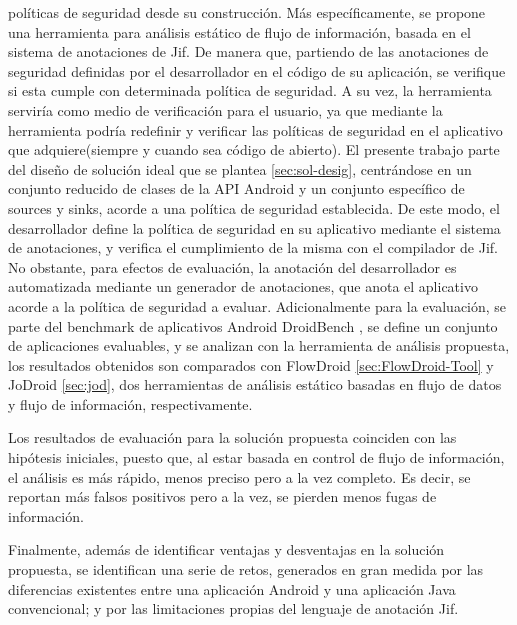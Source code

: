 políticas de seguridad desde su construcción.
Más específicamente, se propone una herramienta para análisis estático de flujo
de información, basada en el sistema de anotaciones de Jif.
De manera que, partiendo de las anotaciones de seguridad definidas por el
desarrollador en el código de su aplicación, se verifique si esta cumple 
con determinada política de seguridad.\newline
A su vez, la herramienta serviría como medio de verificación para el usuario, ya
que mediante la herramienta podría redefinir y verificar las políticas de
seguridad en el aplicativo que adquiere(siempre y cuando sea código de
abierto).\newline
El presente trabajo parte del diseño de solución ideal que se plantea
\ref{sec:sol-desig}, centrándose en un conjunto reducido de clases de la API
Android y un conjunto específico de sources y sinks, acorde a una política de
seguridad establecida.\newline 
De este modo, el desarrollador define la política de seguridad en su
aplicativo mediante el sistema de anotaciones, y verifica el cumplimiento de la
misma con el compilador de Jif.\newline  
No obstante, para efectos de evaluación, la anotación del desarrollador es
automatizada mediante un generador de anotaciones, que anota el aplicativo
acorde a la política de seguridad a evaluar.\newline
Adicionalmente para la evaluación, se parte del benchmark de aplicativos Android
DroidBench \cite{DroidBenchBenchmarks}, se define un conjunto de aplicaciones
evaluables, y se analizan con la herramienta de análisis propuesta, los
resultados obtenidos son comparados con FlowDroid \ref{sec:FlowDroid-Tool} y
JoDroid \ref{sec:jod}, dos herramientas de análisis estático basadas en
flujo de datos y flujo de información, respectivamente.

Los resultados de evaluación para la solución propuesta coinciden con las
hipótesis iniciales, puesto que, al estar basada en control de flujo de
información, el análisis es más rápido, menos preciso pero a la vez completo. Es
decir, se reportan más falsos positivos pero a la vez, se pierden menos fugas de
información.

Finalmente, además de identificar ventajas y desventajas en la solución
propuesta, se identifican una serie de retos, generados en gran medida por las
diferencias existentes entre una aplicación Android y una aplicación Java
convencional; y por las limitaciones propias del lenguaje de anotación Jif.

























